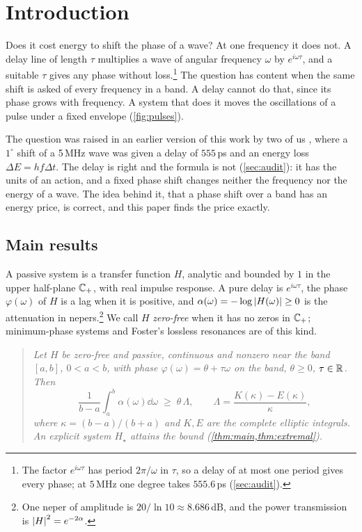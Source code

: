 \section{Introduction}\label{sec:intro}

Does it cost energy to shift the phase of a wave? At one frequency it does
not. A delay line of length $\tau$ multiplies a wave of angular frequency
$\omega$ by $e^{i\omega\tau}$, and a suitable $\tau$ gives any phase without
loss.\footnote{The factor $e^{i\omega\tau}$ has period $2\pi/\omega$ in $\tau$, so a delay of at most one period gives every phase; at $5$\,MHz one degree takes $555.6$\,ps (\cref{sec:audit}).}
The question has content when the same shift is asked of every frequency in
a band. A delay cannot do that, since its phase grows with frequency. A
system that does it moves the oscillations of a pulse under a fixed envelope
(\cref{fig:pulses}).

The question was raised in an earlier version of this work by two of us
\cite{tb23,tb23pre}, where a $1^\circ$ shift of a 5\,MHz wave was
given a delay of $555$\,ps and an energy loss $\Delta E=hf\Delta t$. The delay
is right and the formula is not (\cref{sec:audit}): it has the units of an
action, and a fixed phase shift changes neither the frequency nor the energy
of a wave. The idea behind it, that a phase shift over a band has an energy
price, is correct, and this paper finds the price exactly.

\subsection{Main results}

A passive system is a transfer function $H$, analytic and bounded by $1$ in
the upper half-plane $\mathbb C_{+}$, with real impulse response. A pure delay is
$e^{i\omega\tau}$, the phase $\varphi(\omega)$ of $H$ is a lag when it is
positive, and $\alpha(\omega)=-\log\left|H(\omega)\right|\ge0$ is the attenuation in
nepers.\footnote{One neper of amplitude is $20/\ln10\approx8.686$\,dB, and the power transmission is $\left|H\right|^2=e^{-2\alpha}$.}
We call $H$ \emph{zero-free} when it has no zeros in $\mathbb C_{+}$; minimum-phase
systems and Foster's lossless resonances \cite{foster} are of this kind.

\begin{quote}
\emph{Let $H$ be zero-free and passive, continuous and nonzero near the band
$[a,b]$, $0<a<b$, with phase $\varphi(\omega)=\theta+\tau\omega$ on the band,
$\theta\ge0$, $\tau\in\mathbb R$. Then}
\begin{equation}\label{eq:intro-main}
\frac1{b-a}\int_a^b\alpha(\omega)\dd\omega\;\ge\;\theta\,\Lambda,
\qquad
\Lambda=\frac{K(\kappa)-E(\kappa)}{\kappa},
\end{equation}
\emph{where $\kappa=(b-a)/(b+a)$ and $K,E$ are the complete elliptic
integrals. An explicit system $H_\star$ attains the bound
(\cref{thm:main,thm:extremal}).}
\end{quote}

